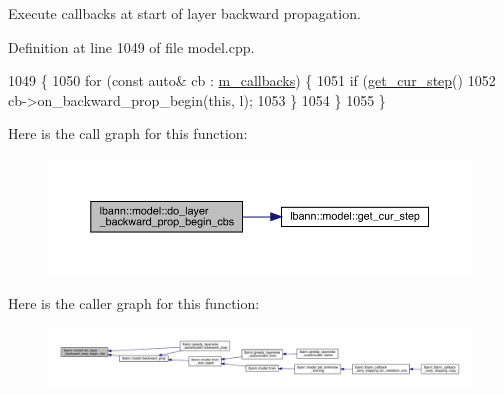 Execute callbacks at start of layer backward propagation. 

Definition at line 1049 of file model.\+cpp.


\begin{DoxyCode}
1049                                                      \{
1050   \textcolor{keywordflow}{for} (\textcolor{keyword}{const} \textcolor{keyword}{auto}& cb : \hyperlink{classlbann_1_1model_a07b511fef30368494c2ad80922ffd0eb}{m\_callbacks}) \{
1051     \textcolor{keywordflow}{if} (\hyperlink{classlbann_1_1model_ad0cdcba177434b52dc9c4a97be183a92}{get\_cur\_step}() %
1052       cb->on\_backward\_prop\_begin(\textcolor{keyword}{this}, l);
1053     \}
1054   \}
1055 \}
\end{DoxyCode}
Here is the call graph for this function\+:\nopagebreak
\begin{figure}[H]
\begin{center}
\leavevmode
\includegraphics[width=350pt]{classlbann_1_1model_a51dc59ea8dd4bc689854732269aaf001_cgraph}
\end{center}
\end{figure}
Here is the caller graph for this function\+:\nopagebreak
\begin{figure}[H]
\begin{center}
\leavevmode
\includegraphics[width=350pt]{classlbann_1_1model_a51dc59ea8dd4bc689854732269aaf001_icgraph}
\end{center}
\end{figure}
\mbox{\label{classlbann_1_1model_ab0939d2668cca7efc2cc52355d34df3b}} 
